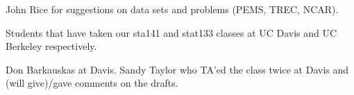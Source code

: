 John Rice for suggestions on data sets and problems (PEMS, TREC, NCAR).

Students that have taken our sta141 and stat133
classes at UC Davis and UC Berkeley respectively.

Don Barkauskas at Davis.
Sandy Taylor who TA'ed the class twice at Davis
and (will give)/gave comments on the drafts.

 
